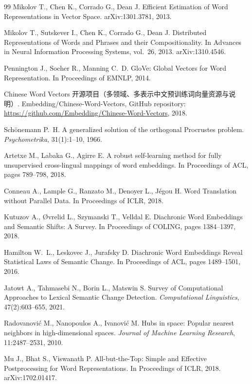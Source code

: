\documentclass[withoutpreface]{cumcmthesis}
\begin{document}
\begin{thebibliography}{99}
Mikolov T., Chen K., Corrado G., Dean J.
Efficient Estimation of Word Representations in Vector Space.
arXiv:1301.3781, 2013.

Mikolov T., Sutskever I., Chen K., Corrado G., Dean J.
Distributed Representations of Words and Phrases and their Compositionality.
In Advances in Neural Information Processing Systems, vol.~26, 2013.
arXiv:1310.4546.

Pennington J., Socher R., Manning C.~D.
GloVe: Global Vectors for Word Representation.
In Proceedings of EMNLP, 2014.

Chinese Word Vectors 开源项目（多领域、多表示中文预训练词向量资源与说明）.
Embedding/Chinese-Word-Vectors, GitHub repository:
\url{https://github.com/Embedding/Chinese-Word-Vectors}, 2018.

Sch\"onemann P.~H.
A generalized solution of the orthogonal Procrustes problem.
\emph{Psychometrika}, 31(1):1--10, 1966.

Artetxe M., Labaka G., Agirre E.
A robust self-learning method for fully unsupervised cross-lingual mappings of word embeddings.
In Proceedings of ACL, pages 789--798, 2018.

Conneau A., Lample G., Ranzato M., Denoyer L., J\'egou H.
Word Translation without Parallel Data.
In Proceedings of ICLR, 2018.

Kutuzov A., {\O}vrelid L., Szymanski T., Velldal E.
Diachronic Word Embeddings and Semantic Shifts: A Survey.
In Proceedings of COLING, pages 1384--1397, 2018.

Hamilton W.~L., Leskovec J., Jurafsky D.
Diachronic Word Embeddings Reveal Statistical Laws of Semantic Change.
In Proceedings of ACL, pages 1489--1501, 2016.

Jatowt A., Tahmasebi N., Borin L., Matswin S.
Survey of Computational Approaches to Lexical Semantic Change Detection.
\emph{Computational Linguistics}, 47(2):603--655, 2021.

Radovanovi\'c M., Nanopoulos A., Ivanovi\'c M.
Hubs in space: Popular nearest neighbors in high-dimensional spaces.
\emph{Journal of Machine Learning Research}, 11:2487--2531, 2010.

Mu J., Bhat S., Viswanath P.
All-but-the-Top: Simple and Effective Postprocessing for Word Representations.
In Proceedings of ICLR, 2018.
arXiv:1702.01417.

\end{thebibliography}
\end{document}
